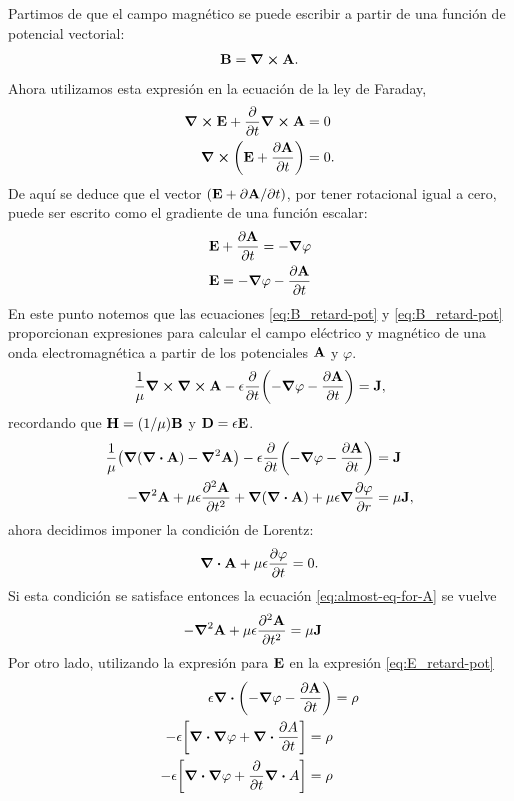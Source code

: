 Partimos de que el campo magnético se puede escribir a partir 
de una función de potencial vectorial:
\begin{align}
\vb{B}=\curl{\vb{A}}. \label{eq:B_retard-pot}
\end{align}
Ahora utilizamos esta expresión en la ecuación de la ley de Faraday,
\begin{align}
\curl{\vb{E}}+\pdv{t}\curl{\vb{A}}&=0 \\
\curl{\qty(\vb{E}+\pdv{\vb{A}}{t})}&=0.
\end{align}
De aquí se deduce que el vector $\qty(\vb{E}+\partial \vb{A}/\partial t)$,
por tener rotacional igual a cero, puede ser escrito como el 
gradiente de una función escalar:
\begin{align}
\vb{E}+\pdv{\vb{A}}{t}=-\grad{\varphi} \\
\vb{E}=-\grad{\varphi}-\pdv{\vb{A}}{t} \label{eq:E_retard-pot}
\end{align}
En este punto notemos que las ecuaciones \eqref{eq:B_retard-pot} y
\eqref{eq:B_retard-pot} proporcionan expresiones para calcular el 
campo eléctrico y magnético de una onda electromagnética a partir 
de los potenciales $\vb{A}$ y $\varphi$.
\begin{align}
\frac{1}{\mu}\curl{\curl{\vb{A}}}-
\epsilon\pdv{t}\qty(-\grad{\varphi}-\pdv{\vb{A}}{t})=\vb{J},
\end{align}
recordando que $\vb{H}=(1/\mu)\vb{B}$ y $\vb{D}=\epsilon\vb{E}$.
\begin{align}
\frac{1}{\mu}\qty(\grad{\qty(\div{\vb{A}})}-\grad^2\vb{A})-
\epsilon\pdv{t}\qty(-\grad{\varphi}-\pdv{\vb{A}}{t})&=\vb{J}\\
-\grad^2\vb{A}+\mu\epsilon\pdv[2]{\vb{A}}{t}+
\grad{\qty(\div{\vb{A}})}+\mu\epsilon\grad{\pdv{\varphi}{r}}&=\mu\vb{J},
\label{eq:almost-eq-for-A}
\end{align}
ahora decidimos imponer la condición de Lorentz:
\begin{align}
\div{\vb{A}}+\mu\epsilon\pdv{\varphi}{t}=0.
\end{align}
Si esta condición se satisface entonces la ecuación \eqref{eq:almost-eq-for-A}
se vuelve
\begin{align}
-\grad^2\vb{A}+\mu\epsilon\pdv[2]{\vb{A}}{t}&=\mu\vb{J}
\end{align}
Por otro lado, utilizando la expresión para $\vb{E}$ en la expresión 
\eqref{eq:E_retard-pot}
\begin{align}
\epsilon\div{\qty(-\grad{\varphi}-\pdv{\vb{A}}{t})}&=\rho\\
-\epsilon\qty[\div{\grad{\varphi}}+\div{\pdv{A}{t}}]=\rho\\
-\epsilon\qty[\div{\grad{\varphi}}+\pdv{t}\div{A}]=\rho
\end{align}

